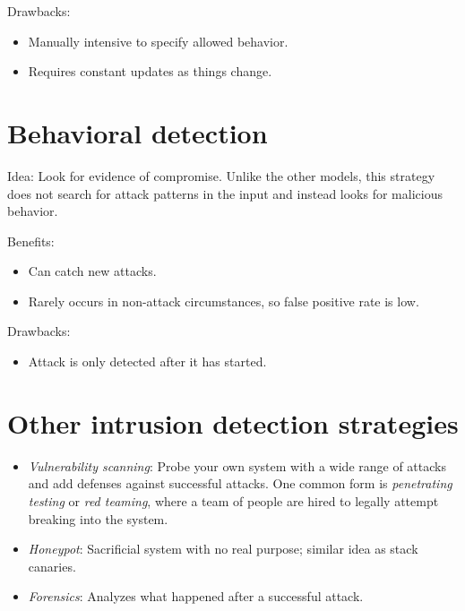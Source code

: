 Drawbacks:
\begin{itemize}
    \item Manually intensive to specify allowed behavior.
    \item Requires constant updates as things change.
\end{itemize}

\section{Behavioral detection}
Idea: Look for evidence of compromise. Unlike the other models, this strategy does not search for attack patterns in the input and instead looks for malicious behavior.

\medskip
Benefits:
\begin{itemize}
    \item Can catch new attacks.
    \item Rarely occurs in non-attack circumstances, so false positive rate is low.
\end{itemize}

Drawbacks:
\begin{itemize}
    \item Attack is only detected after it has started.
\end{itemize}

\section{Other intrusion detection strategies}
\begin{itemize}
    \item \emph{Vulnerability scanning}: Probe your own system with a wide range of attacks and add defenses against successful attacks. One common form is \emph{penetrating testing} or \emph{red teaming}, where a team of people are hired to legally attempt breaking into the system.
    
    \item \emph{Honeypot}: Sacrificial system with no real purpose; similar idea as stack canaries.
    
    \item \emph{Forensics}: Analyzes what happened after a successful attack.  
\end{itemize}